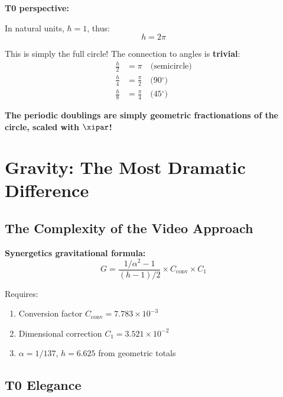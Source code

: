 	\begin{vorteil}
		\textbf{T0 perspective:}
		
		In natural units, $\hbar = 1$, thus:
		\begin{equation}
			h = 2\pi
		\end{equation}
		
		This is simply the full circle! The connection to angles is \textbf{trivial}:
		\begin{align}
			\frac{h}{2} &= \pi \quad \text{(semicircle)} \\
			\frac{h}{4} &= \frac{\pi}{2} \quad \text{(90$^\circ$)} \\
			\frac{h}{8} &= \frac{\pi}{4} \quad \text{(45$^\circ$)}
		\end{align}
		
		\textbf{The periodic doublings are simply geometric fractionations of the circle, scaled with $\xipar$!}
	\end{vorteil}
	
	\section{Gravity: The Most Dramatic Difference}
	
	\subsection{The Complexity of the Video Approach}
	
	\textbf{Synergetics gravitational formula:}
	\begin{equation}
		G = \frac{1/\alpha^2 - 1}{(h - 1)/2} \times C_{\text{conv}} \times C_1
	\end{equation}
	
	Requires:
	\begin{enumerate}
		\item Conversion factor $C_{\text{conv}} = 7.783 \times 10^{-3}$
		\item Dimensional correction $C_1 = 3.521 \times 10^{-2}$
		\item $\alpha = 1/137$, $h=6.625$ from geometric totals
	\end{enumerate}
	
	\subsection{T0 Elegance}
	
